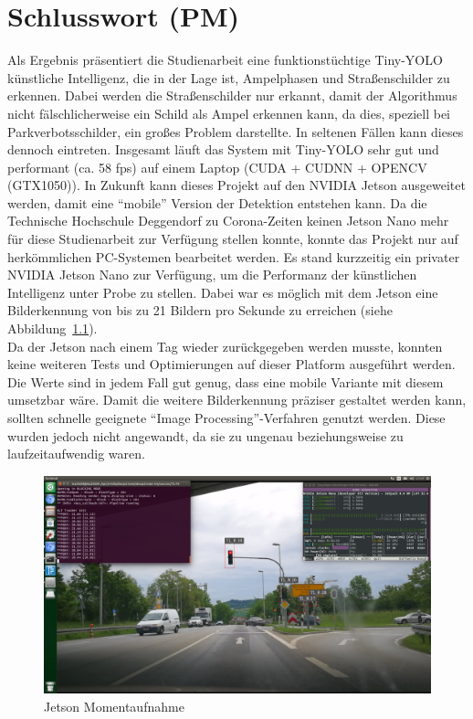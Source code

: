\documentclass[a4paper,oneside,12pt]{report}
\begin{document}
	\chapter{Schlusswort (PM)}
	\begin{onehalfspace}
		Als Ergebnis präsentiert die Studienarbeit eine funktionstüchtige Tiny-YOLO künstliche Intelligenz, die in der Lage ist, Ampelphasen und Straßenschilder zu erkennen. Dabei werden die Straßenschilder nur erkannt, damit der Algorithmus nicht fälschlicherweise ein Schild als Ampel erkennen kann, da dies, speziell bei Parkverbotsschilder, ein großes Problem darstellte. In seltenen Fällen kann dieses dennoch eintreten. Insgesamt läuft das System mit Tiny-YOLO sehr gut und performant (ca. 58 fps) auf einem Laptop (CUDA + CUDNN + OPENCV (GTX1050)). In Zukunft kann dieses Projekt auf den NVIDIA Jetson ausgeweitet werden, damit eine "`mobile"' Version der Detektion entstehen kann. Da die Technische Hochschule Deggendorf zu Corona-Zeiten keinen Jetson Nano mehr für diese Studienarbeit zur Verfügung stellen konnte, konnte das Projekt nur auf herkömmlichen PC-Systemen bearbeitet werden. Es stand kurzzeitig ein privater NVIDIA Jetson Nano zur Verfügung, um die Performanz der künstlichen Intelligenz unter Probe zu stellen. Dabei war es möglich mit dem Jetson eine Bilderkennung von bis zu 21 Bildern pro Sekunde zu erreichen (siehe Abbildung~\ref{fig:Jetson}).\\
		Da der Jetson nach einem Tag wieder zurückgegeben werden musste, konnten keine weiteren Tests und Optimierungen auf dieser Platform ausgeführt werden. Die Werte sind in jedem Fall gut genug, dass eine mobile Variante mit diesem umsetzbar wäre. Damit die weitere Bilderkennung präziser gestaltet werden kann, sollten schnelle geeignete "`Image Processing"'-Verfahren genutzt werden. Diese wurden jedoch nicht angewandt, da sie zu ungenau beziehungsweise zu laufzeitaufwendig waren.
		\begin{figure}[h!]
			\includegraphics[width=\linewidth]{Jetson.png}
			\caption{Jetson Momentaufnahme}
			\label{fig:Jetson}
		\end{figure}
	\end{onehalfspace}
	
\end{document}
